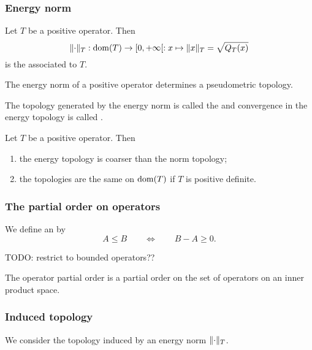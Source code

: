 \subsubsection{Energy norm}
\begin{definition}
Let $T$ be a positive operator. Then
\[ \lVert\cdot\rVert_T: \operatorname{dom}(T) \to [0,+\infty[: x\mapsto \lVert x\rVert_T = \sqrt{Q_T(x)} \]
is the  associated to $T$.
\end{definition}

\begin{lemma}
The energy norm of a positive operator determines a pseudometric topology.
\end{lemma}

\begin{definition}
The topology generated by the energy norm is called the  and convergence in the energy topology is called .
\end{definition}

\begin{proposition}
Let $T$ be a positive operator. Then
\begin{enumerate}
\item the energy topology is coarser than the norm topology;
\item the topologies are the same on $\operatorname{dom}(T)$ if $T$ is positive definite.
\end{enumerate}
\end{proposition}

\subsubsection{The partial order on operators}
\begin{definition}
We define an  by
\[ A\leq B \qquad\iff\qquad B-A \geq 0. \]
\end{definition}
TODO: restrict to bounded operators??

\begin{lemma}
The operator partial order is a partial order on the set of operators on an inner product space.
\end{lemma}

\subsubsection{Induced topology}
We consider the topology induced by an energy norm $\lVert\cdot\rVert_T$.

